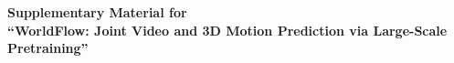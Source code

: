 \clearpage
\appendix
\setcounter{figure}{0}
\setcounter{table}{0}
\renewcommand{\thefigure}{\Roman{figure}}
\renewcommand{\thetable}{\Roman{table}}
\renewcommand{\theHfigure}{appendix.\Roman{figure}}
\renewcommand{\theHtable}{appendix.\Roman{table}}

\begin{center}
    {\Large\bf Supplementary Material for \\[2pt]
    ``WorldFlow: Joint Video and 3D Motion Prediction via Large-Scale Pretraining''}
\end{center}
\vspace{1em}



